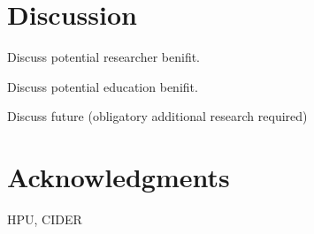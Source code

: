 \documentclass[12pt,a4paper]{article}
\begin{document}
\section{Discussion}
Discuss potential researcher benifit.

Discuss potential education benifit.

Discuss future (obligatory additional research required)
\section{Acknowledgments}
HPU, CIDER


\end{document}
